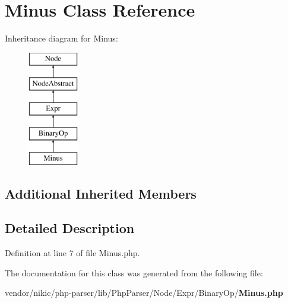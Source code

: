\section{Minus Class Reference}
\label{class_php_parser_1_1_node_1_1_expr_1_1_binary_op_1_1_minus}
Inheritance diagram for Minus\+:\begin{figure}[H]
\begin{center}
\leavevmode
\includegraphics[height=5.000000cm]{class_php_parser_1_1_node_1_1_expr_1_1_binary_op_1_1_minus}
\end{center}
\end{figure}
\subsection*{Additional Inherited Members}


\subsection{Detailed Description}


Definition at line 7 of file Minus.\+php.



The documentation for this class was generated from the following file\+:\begin{DoxyCompactItemize}
\item 
vendor/nikic/php-\/parser/lib/\+Php\+Parser/\+Node/\+Expr/\+Binary\+Op/{\bf Minus.\+php}\end{DoxyCompactItemize}
